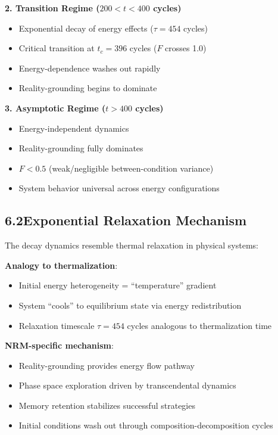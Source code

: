 \documentclass[11pt]{article}
\begin{document}
\noindent\textbf{2. Transition Regime ($200 < t < 400$ cycles)}
\begin{itemize}
    \item Exponential decay of energy effects ($\tau = 454$ cycles)
    \item Critical transition at $t_c = 396$ cycles ($F$ crosses 1.0)
    \item Energy-dependence washes out rapidly
    \item Reality-grounding begins to dominate
\end{itemize}

\noindent\textbf{3. Asymptotic Regime ($t > 400$ cycles)}
\begin{itemize}
    \item Energy-independent dynamics
    \item Reality-grounding fully dominates
    \item $F < 0.5$ (weak/negligible between-condition variance)
    \item System behavior universal across energy configurations
\end{itemize}

\subsection*{6.2\quad Exponential Relaxation Mechanism}

The decay dynamics resemble thermal relaxation in physical systems:

\noindent\textbf{Analogy to thermalization}:
\begin{itemize}
    \item Initial energy heterogeneity = ``temperature'' gradient
    \item System ``cools'' to equilibrium state via energy redistribution
    \item Relaxation timescale $\tau = 454$ cycles analogous to thermalization time
\end{itemize}

\noindent\textbf{NRM-specific mechanism}:
\begin{itemize}
    \item Reality-grounding provides energy flow pathway
    \item Phase space exploration driven by transcendental dynamics
    \item Memory retention stabilizes successful strategies
    \item Initial conditions wash out through composition-decomposition cycles
\end{itemize}
\end{document}
